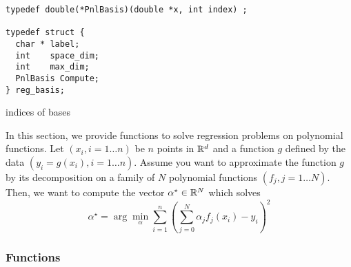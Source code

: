 \begin{verbatim}
typedef double(*PnlBasis)(double *x, int index) ;

typedef struct {
  char * label;
  int    space_dim;
  int    max_dim;
  PnlBasis Compute;
} reg_basis;

\end{verbatim}

\begin{table}[h!]
  \begin{describeconst}
  \end{describeconst}
  \caption{indices of bases}
  \label{basis_index}
\end{table}

In this section, we provide functions to solve regression problems on
polynomial functions. Let $(x_i, i=1 \dots n)$ be $n$ points in ${\mathbb R}^d$ and a
function $g$ defined by the data $(y_i = g(x_i), i=1 \dots n)$. Assume you
want to approximate the function $g$ by its decomposition on a family of $N$
polynomial functions $(f_j, j=1\dots N)$. Then, we want to compute the vector
$\alpha^\star \in {\mathbb R}^N$ which solves
\begin{equation*} \alpha^\star = \arg\min_\alpha \sum_{i=1}^{n}
  \left(\sum_{j=0}^N \alpha_j f_j(x_i) - y_i\right)^2
\end{equation*}

\subsubsection{Functions}

